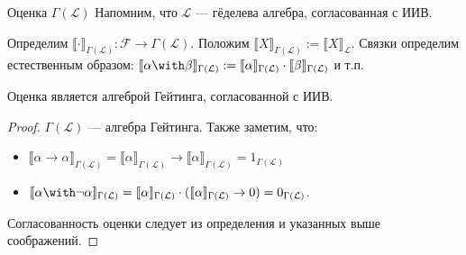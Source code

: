 \documentclass[aspectratio=169]{beamer}
\begin{document}
\begin{frame}{Оценка $\Gamma(\mathcal{L})$}
Напомним, что $\mathcal{L}$ --- гёделева алгебра, согласованная с ИИВ.
\begin{defrus}
Определим $\llbracket\cdot\rrbracket_{\Gamma(\mathcal{L})} : \mathcal{F} \rightarrow \Gamma(\mathcal{L})$.
Положим $\llbracket X \rrbracket_{\Gamma(\mathcal{L})} := \llbracket X \rrbracket_\mathcal{L}$.
Связки определим естественным образом:
$\llbracket \alpha\with\beta \rrbracket_{\Gamma(\mathcal{L})} := \llbracket \alpha\rrbracket_{\Gamma(\mathcal{L})}\cdot\llbracket\beta \rrbracket_{\Gamma(\mathcal{L})}$
и т.п.
\end{defrus}
\begin{thmrus}
Оценка является алгеброй Гейтинга, согласованной с ИИВ.
\end{thmrus}
\begin{proof}
$\Gamma(\mathcal{L})$ --- алгебра Гейтинга.
Также заметим, что:
\begin{itemize}
\item $\llbracket \alpha\rightarrow\alpha \rrbracket_{\Gamma(\mathcal{L})} = \llbracket \alpha\rrbracket_{\Gamma(\mathcal{L})}\rightarrow\llbracket\alpha \rrbracket_{\Gamma(\mathcal{L})}
= 1_{\Gamma(\mathcal{L})}$
\item $\llbracket \alpha\with\neg\alpha \rrbracket_{\Gamma(\mathcal{L})} = \llbracket \alpha\rrbracket_{\Gamma(\mathcal{L})} \cdot (\llbracket \alpha\rrbracket_{\Gamma(\mathcal{L})}\rightarrow 0)
= 0_{\Gamma(\mathcal{L})}$.
\end{itemize}

Согласованность оценки следует из определения и указанных выше соображений.
\end{proof}
\end{frame}
\end{document}
